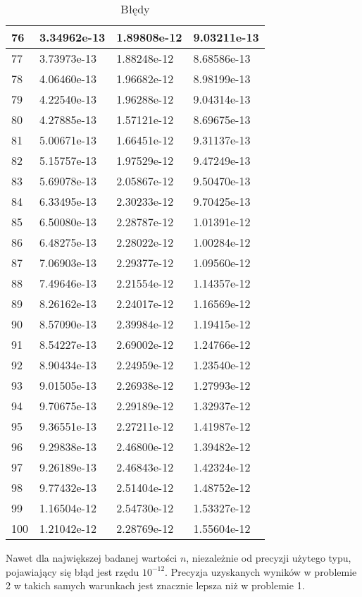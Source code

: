 \documentclass{article}
\begin{document}
\begin{table}[H]
{\begin{tabular}{|l|l|l|l|}
76 & 3.34962e-13 & 1.89808e-12 & 9.03211e-13 \\ \hline
77 & 3.73973e-13 & 1.88248e-12 & 8.68586e-13 \\ \hline
78 & 4.06460e-13 & 1.96682e-12 & 8.98199e-13 \\ \hline
79 & 4.22540e-13 & 1.96288e-12 & 9.04314e-13 \\ \hline
80 & 4.27885e-13 & 1.57121e-12 & 8.69675e-13 \\ \hline
81 & 5.00671e-13 & 1.66451e-12 & 9.31137e-13 \\ \hline
82 & 5.15757e-13 & 1.97529e-12 & 9.47249e-13 \\ \hline
83 & 5.69078e-13 & 2.05867e-12 & 9.50470e-13 \\ \hline
84 & 6.33495e-13 & 2.30233e-12 & 9.70425e-13 \\ \hline
85 & 6.50080e-13 & 2.28787e-12 & 1.01391e-12 \\ \hline
86 & 6.48275e-13 & 2.28022e-12 & 1.00284e-12 \\ \hline
87 & 7.06903e-13 & 2.29377e-12 & 1.09560e-12 \\ \hline
88 & 7.49646e-13 & 2.21554e-12 & 1.14357e-12 \\ \hline
89 & 8.26162e-13 & 2.24017e-12 & 1.16569e-12 \\ \hline
90 & 8.57090e-13 & 2.39984e-12 & 1.19415e-12 \\ \hline
91 & 8.54227e-13 & 2.69002e-12 & 1.24766e-12 \\ \hline
92 & 8.90434e-13 & 2.24959e-12 & 1.23540e-12 \\ \hline
93 & 9.01505e-13 & 2.26938e-12 & 1.27993e-12 \\ \hline
94 & 9.70675e-13 & 2.29189e-12 & 1.32937e-12 \\ \hline
95 & 9.36551e-13 & 2.27211e-12 & 1.41987e-12 \\ \hline
96 & 9.29838e-13 & 2.46800e-12 & 1.39482e-12 \\ \hline
97 & 9.26189e-13 & 2.46843e-12 & 1.42324e-12 \\ \hline
98 & 9.77432e-13 & 2.51404e-12 & 1.48752e-12 \\ \hline
99 & 1.16504e-12 & 2.54730e-12 & 1.53327e-12 \\ \hline
100 & 1.21042e-12 & 2.28769e-12 & 1.55604e-12 \\ \hline
\end{tabular}
\hspace*{-2.5cm}
}
\caption{Błędy}
\end{table}

Nawet dla największej badanej wartości $n$, niezależnie od precyzji użytego typu, pojawiający się błąd jest
rzędu $10^{-12}$. Precyzja uzyskanych wyników w problemie 2 w takich samych warunkach jest znacznie lepsza niż w 
problemie 1.
\end{document}
